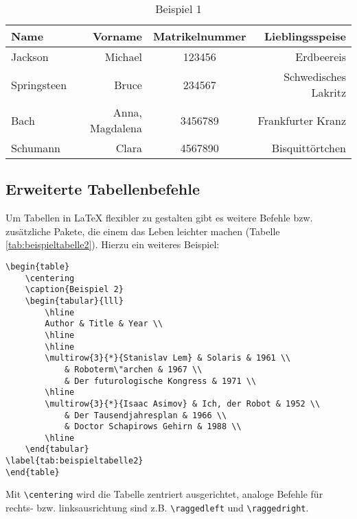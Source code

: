 \begin{table}[b]
	
	\caption{Beispiel 1}
	\begin{tabular}{lrcr}
		\toprule
		\textbf{Name} & \textbf{Vorname} & \textbf{Matrikelnummer} & \textbf{Lieblingsspeise}\\
		\midrule
		Jackson & Michael & 123456 & Erdbeereis \\
		Springsteen & Bruce & 234567 & Schwedisches Lakritz \\
		Bach & Anna, Magdalena & 3456789 & Frankfurter Kranz \\
		Schumann & Clara & 4567890 & Bisquittörtchen \\
		\bottomrule
	\end{tabular}
	\label{tab:beispieltabelle1}
\end{table}

\subsection{Erweiterte Tabellenbefehle}
Um Tabellen in LaTeX flexibler zu gestalten gibt es weitere Befehle bzw. zusätzliche Pakete, die einem das Leben leichter machen (Tabelle \ref{tab:beispieltabelle2}). Hierzu ein weiteres Beispiel:

\begin{lstlisting}[caption={Tabelle \ref{tab:beispieltabelle2}}]
\begin{table}
	\centering
	\caption{Beispiel 2}
	\begin{tabular}{lll}
		\hline
		Author & Title & Year \\
		\hline
		\hline
		\multirow{3}{*}{Stanislav Lem} & Solaris & 1961 \\
 			& Roboterm\"archen & 1967 \\
 			& Der futurologische Kongress & 1971 \\
		\hline
		\multirow{3}{*}{Isaac Asimov} & Ich, der Robot & 1952 \\
 			& Der Tausendjahresplan & 1966 \\
 			& Doctor Schapirows Gehirn & 1988 \\
		\hline
	\end{tabular}
\label{tab:beispieltabelle2}
\end{table}
\end{lstlisting}

Mit \lstinline|\centering| wird die Tabelle zentriert ausgerichtet, analoge Befehle für rechts- bzw. linksausrichtung sind z.B. \lstinline|\raggedleft| und \lstinline|\raggedright|. \\

